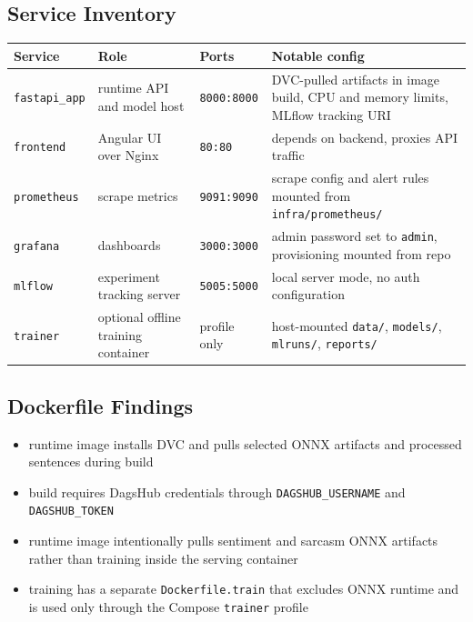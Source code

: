 \subsection{Service Inventory}
\begin{table}[H]
\centering
\begin{tabularx}{\textwidth}{@{}l l l X@{}}
\toprule
\textbf{Service} & \textbf{Role} & \textbf{Ports} & \textbf{Notable config} \\
\midrule
\texttt{fastapi\_app} & runtime API and model host & \texttt{8000:8000} & DVC-pulled artifacts in image build, CPU and memory limits, MLflow tracking URI \\
\texttt{frontend} & Angular UI over Nginx & \texttt{80:80} & depends on backend, proxies API traffic \\
\texttt{prometheus} & scrape metrics & \texttt{9091:9090} & scrape config and alert rules mounted from \texttt{infra/prometheus/} \\
\texttt{grafana} & dashboards & \texttt{3000:3000} & admin password set to \texttt{admin}, provisioning mounted from repo \\
\texttt{mlflow} & experiment tracking server & \texttt{5005:5000} & local server mode, no auth configuration \\
\texttt{trainer} & optional offline training container & profile only & host-mounted \texttt{data/}, \texttt{models/}, \texttt{mlruns/}, \texttt{reports/} \\
\bottomrule
\end{tabularx}
\end{table}

\subsection{Dockerfile Findings}
\begin{itemize}[leftmargin=1.2em]
  \item runtime image installs DVC and pulls selected ONNX artifacts and processed sentences during build
  \item build requires DagsHub credentials through \texttt{DAGSHUB\_USERNAME} and \texttt{DAGSHUB\_TOKEN}
  \item runtime image intentionally pulls sentiment and sarcasm ONNX artifacts rather than training inside the serving container
  \item training has a separate \texttt{Dockerfile.train} that excludes ONNX runtime and is used only through the Compose \texttt{trainer} profile
\end{itemize}

